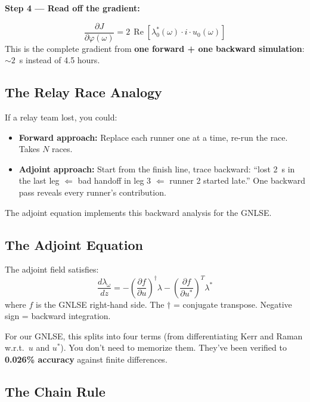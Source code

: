 \documentclass[12pt,a4paper]{article}
\newcommand{\Real}{\operatorname{Re}}
\newcommand{\pdv}[2]{\frac{\partial #1}{\partial #2}}
\newcommand{\dv}[2]{\frac{d #1}{d #2}}
\begin{document}
\textbf{Step 4 --- Read off the gradient:}
\begin{keyeq}
\begin{equation}
\boxed{\pdv{J}{\varphi(\omega)} = 2\,\Real\!\left[\lambda_0^*(\omega)\cdot i\cdot u_0(\omega)\right]}
\label{eq:gradient}
\end{equation}
This is the complete gradient from \textbf{one forward + one backward simulation}: ${\sim}2$~s instead of 4.5 hours.
\end{keyeq}

\subsection{The Relay Race Analogy}

If a relay team lost, you could:
\begin{itemize}
    \item \textbf{Forward approach:} Replace each runner one at a time, re-run the race. Takes $N$ races.
    \item \textbf{Adjoint approach:} Start from the finish line, trace backward: ``lost 2~s in the last leg $\Leftarrow$ bad handoff in leg 3 $\Leftarrow$ runner 2 started late.'' One backward pass reveals every runner's contribution.
\end{itemize}

The adjoint equation implements this backward analysis for the GNLSE.

\subsection{The Adjoint Equation}

The adjoint field satisfies:
\begin{equation}
\dv{\lambda_\omega}{z} = -\left(\pdv{f}{u}\right)^\dagger \lambda - \left(\pdv{f}{u^*}\right)^T \lambda^*
\label{eq:adjoint}
\end{equation}
where $f$ is the GNLSE right-hand side. The $\dagger$ = conjugate transpose. Negative sign = backward integration.

For our GNLSE, this splits into four terms (from differentiating Kerr and Raman w.r.t.\ $u$ and $u^*$). You don't need to memorize them. They've been verified to \textbf{0.026\% accuracy} against finite differences.

\subsection{The Chain Rule}
\end{document}
